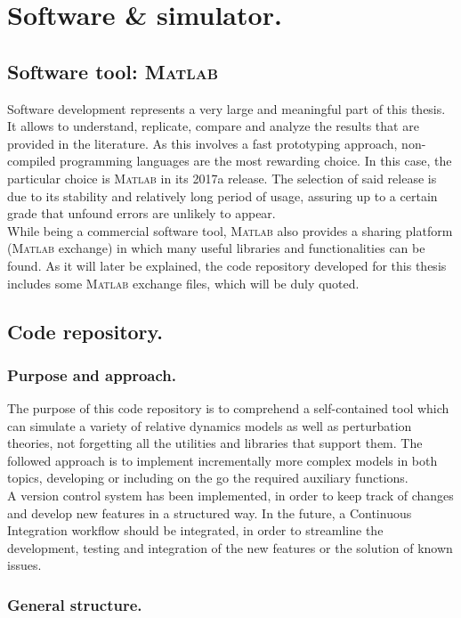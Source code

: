 \chapter{Software \& simulator.}
%
\label{app:App_D}
%
\section{Software tool: \textsc{Matlab}}
%
\indent Software development represents a very large and meaningful part of this thesis. It allows to understand, replicate, compare and analyze the results that are provided in the literature. As this involves a fast prototyping approach, non-compiled programming languages are the most rewarding choice. In this case, the particular choice is \textsc{Matlab} in its 2017a release. The selection of said release is due to its stability and relatively long period of usage, assuring up to a certain grade that unfound errors are unlikely to appear. \\
%
\indent While being a commercial software tool, \textsc{Matlab} also provides a sharing platform (\textsc{Matlab} exchange) in which many useful libraries and functionalities can be found. As it will later be explained, the code repository developed for this thesis includes some \textsc{Matlab} exchange files, which will be duly quoted.
%
\section{Code repository.}
%
%
	\subsection{Purpose and approach.}
	\indent The purpose of this code repository is to comprehend a self-contained tool which can simulate a variety of relative dynamics models as well as perturbation theories, not forgetting all the utilities and libraries that support them. The followed approach is to implement incrementally more complex models in both topics, developing or including on the go the required auxiliary functions.\\
	\indent A version control system has been implemented, in order to keep track of changes and develop new features in a structured way. In the future, a Continuous Integration workflow should be integrated, in order to streamline the development, testing and integration of the new features or the solution of known issues.
	\subsection{General structure.}
